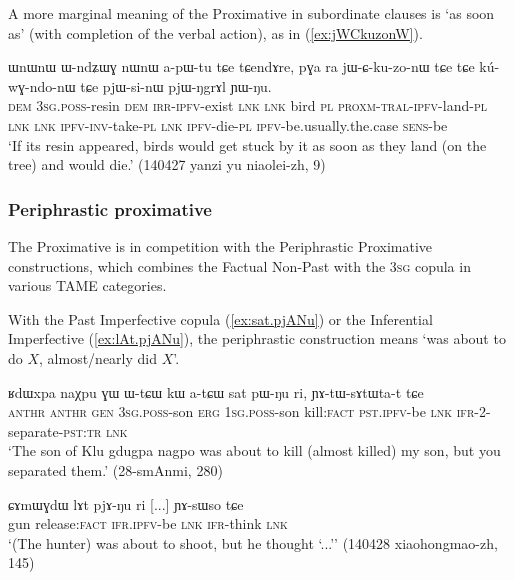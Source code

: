 A more marginal meaning of the Proximative in subordinate clauses is `as soon as' (with completion of the verbal action), as in (\ref{ex:jWCkuzonW}).

 \begin{exe} 
\ex \label{ex:jWCkuzonW}
\gll  ɯnɯnɯ ɯ-ndʑɯɣ nɯnɯ a-pɯ-tu tɕe tɕendɤre, pɣa ra jɯ-ɕ-ku-zo-nɯ tɕe tɕe kú-wɣ-ndo-nɯ tɕe pjɯ-si-nɯ pjɯ-ŋgrɤl ɲɯ-ŋu. \\
\textsc{dem} \textsc{3sg}.\textsc{poss}-resin \textsc{dem} \textsc{irr}-\textsc{ipfv}-exist \textsc{lnk} \textsc{lnk} bird \textsc{pl} \textsc{proxm}-\textsc{tral}-\textsc{ipfv}-land-\textsc{pl} \textsc{lnk} \textsc{lnk} \textsc{ipfv}-\textsc{inv}-take-\textsc{pl} \textsc{lnk} \textsc{ipfv}-die-\textsc{pl} \textsc{ipfv}-be.usually.the.case \textsc{sens}-be \\
\glt `If its resin appeared, birds would get stuck by it as soon as they land (on the tree) and would die.' (140427 yanzi yu niaolei-zh, 9)
 \end{exe}
 

 
\subsubsection{Periphrastic proximative} \label{sec:proximative.periphrastic}
The Proximative is in competition with the Periphrastic Proximative constructions, which combines the Factual Non-Past with the \textsc{3sg} copula in various TAME categories.

With the Past Imperfective copula  (\ref{ex:sat.pjANu}) or the Inferential Imperfective  (\ref{ex:lAt.pjANu}), the periphrastic construction means `was about to do $X$, almost/nearly did $X$'.

  \begin{exe} 
\ex \label{ex:sat.pjANu}
\gll ʁdɯxpa naχpu ɣɯ ɯ-tɕɯ kɯ a-tɕɯ sat pɯ-ŋu ri, ɲɤ-tɯ-sɤtɯta-t tɕe  \\
\textsc{anthr}  \textsc{anthr} \textsc{gen} \textsc{3sg}.\textsc{poss}-son \textsc{erg} \textsc{1sg}.\textsc{poss}-son kill:\textsc{fact} \textsc{pst}.\textsc{ipfv}-be \textsc{lnk} \textsc{ifr}-2-separate-\textsc{pst}:\textsc{tr} \textsc{lnk} \\
\glt `The son of Klu gdugpa nagpo was about to kill (almost killed) my son, but you separated them.' (28-smAnmi, 280)
 \end{exe}
 
  \begin{exe} 
\ex \label{ex:lAt.pjANu}
\gll  ɕɤmɯɣdɯ lɤt pjɤ-ŋu ri [...] ɲɤ-sɯso tɕe \\
gun release:\textsc{fact} \textsc{ifr}.\textsc{ipfv}-be \textsc{lnk} { } \textsc{ifr}-think \textsc{lnk} \\
\glt `(The hunter) was about to shoot, but he thought `...'' (140428 xiaohongmao-zh, 145)
 \end{exe}
 
